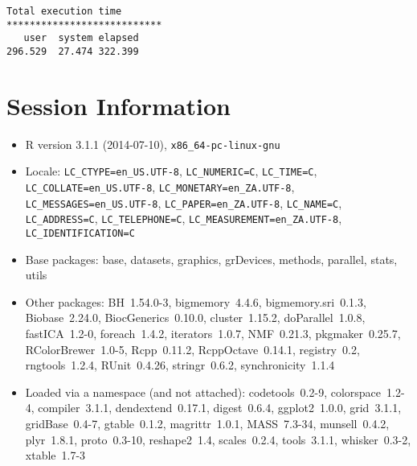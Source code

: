 \documentclass[10pt]{article}\usepackage[]{graphicx}\usepackage[]{color}
\begin{document}
\begin{verbatim}
Total execution time
***************************
   user  system elapsed 
296.529  27.474 322.399 

\end{verbatim}

\section*{Session Information}
\begin{itemize}\raggedright
  \item R version 3.1.1 (2014-07-10), \verb|x86_64-pc-linux-gnu|
  \item Locale: \verb|LC_CTYPE=en_US.UTF-8|, \verb|LC_NUMERIC=C|, \verb|LC_TIME=C|, \verb|LC_COLLATE=en_US.UTF-8|, \verb|LC_MONETARY=en_ZA.UTF-8|, \verb|LC_MESSAGES=en_US.UTF-8|, \verb|LC_PAPER=en_ZA.UTF-8|, \verb|LC_NAME=C|, \verb|LC_ADDRESS=C|, \verb|LC_TELEPHONE=C|, \verb|LC_MEASUREMENT=en_ZA.UTF-8|, \verb|LC_IDENTIFICATION=C|
  \item Base packages: base, datasets, graphics, grDevices, methods,
    parallel, stats, utils
  \item Other packages: BH~1.54.0-3, bigmemory~4.4.6,
    bigmemory.sri~0.1.3, Biobase~2.24.0, BiocGenerics~0.10.0,
    cluster~1.15.2, doParallel~1.0.8, fastICA~1.2-0, foreach~1.4.2,
    iterators~1.0.7, NMF~0.21.3, pkgmaker~0.25.7, RColorBrewer~1.0-5,
    Rcpp~0.11.2, RcppOctave~0.14.1, registry~0.2, rngtools~1.2.4,
    RUnit~0.4.26, stringr~0.6.2, synchronicity~1.1.4
  \item Loaded via a namespace (and not attached): codetools~0.2-9,
    colorspace~1.2-4, compiler~3.1.1, dendextend~0.17.1, digest~0.6.4,
    ggplot2~1.0.0, grid~3.1.1, gridBase~0.4-7, gtable~0.1.2,
    magrittr~1.0.1, MASS~7.3-34, munsell~0.4.2, plyr~1.8.1,
    proto~0.3-10, reshape2~1.4, scales~0.2.4, tools~3.1.1,
    whisker~0.3-2, xtable~1.7-3
\end{itemize}
\end{document}
